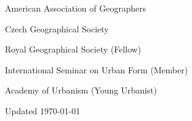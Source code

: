 \documentclass[12pt,a4paper]{report}
\begin{document}
    \begin{tablist}

        \item[2025--] \tab{}American Association of Geographers
        \item[2025--] \tab{}Czech Geographical Society
        \item[2021--] \tab{}Royal Geographical Society (Fellow)
        \item[2019--] \tab{}International Seminar on Urban Form (Member)
        \item[2018--22] \tab{}Academy of Urbanism (Young Urbanist)

    \end{tablist}

    \begin{center}
        \vfill
        Updated \monthyeardate\today
    \end{center}
\end{document}
